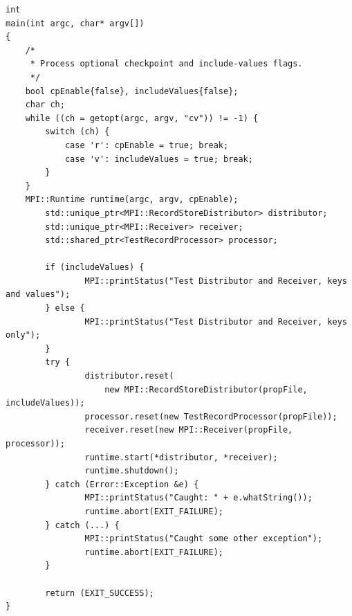 \begin{lstlisting}[caption={MPI Framework Application Main}, label=lst:mpiappmain]
int
main(int argc, char* argv[])
{
	/*
	 * Process optional checkpoint and include-values flags.
	 */
	bool cpEnable{false}, includeValues{false};
	char ch;
	while ((ch = getopt(argc, argv, "cv")) != -1) {
		switch (ch) {
			case 'r': cpEnable = true; break;
			case 'v': includeValues = true; break;
		}
	}
	MPI::Runtime runtime(argc, argv, cpEnable);
        std::unique_ptr<MPI::RecordStoreDistributor> distributor;
        std::unique_ptr<MPI::Receiver> receiver;
        std::shared_ptr<TestRecordProcessor> processor;

        if (includeValues) {
                MPI::printStatus("Test Distributor and Receiver, keys and values");
        } else {
                MPI::printStatus("Test Distributor and Receiver, keys only");
        }
        try {
                distributor.reset(
                    new MPI::RecordStoreDistributor(propFile, includeValues));
                processor.reset(new TestRecordProcessor(propFile));
                receiver.reset(new MPI::Receiver(propFile, processor));
                runtime.start(*distributor, *receiver);
                runtime.shutdown();
        } catch (Error::Exception &e) {
                MPI::printStatus("Caught: " + e.whatString());
                runtime.abort(EXIT_FAILURE);
        } catch (...) {
                MPI::printStatus("Caught some other exception");
                runtime.abort(EXIT_FAILURE);
        }

        return (EXIT_SUCCESS);
}

\end{lstlisting}
